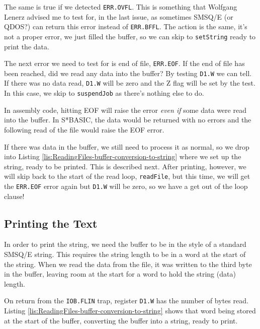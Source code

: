The same is true if we detected \texttt{ERR.OVFL}. This is something
that Wolfgang Lenerz advised me to test for, in the last issue, as
sometimes SMSQ/E (or QDOS?) can return this error instead of \texttt{ERR.BFFL}.
The action is the same, it's not a proper error, we just filled the
buffer, so we can skip to \texttt{setString} ready to print the data.

The next error we need to test for is end of file, \texttt{ERR.EOF}.
If the end of file has been reached, did we read any data into the
buffer? By testing \texttt{D1.W} we can tell. If there was no data
read, \texttt{D1.W} will be zero and the Z flag will be set by the
test. In this case, we skip to \texttt{suspendJob} as there's nothing
else to do.

In assembly code, hitting EOF will raise the error \emph{even if}
some data were read into the buffer. In S{*}BASIC, the data would
be returned with no errors and the following read of the file would
raise the EOF error.

If there was data in the buffer, we still need to process it as normal,
so we drop into Listing \ref{lis:ReadingFiles-buffer-conversion-to-string}
where we set up the string, ready to be printed. This is described
next. After printing, however, we will skip back to the start of the
read loop, \texttt{readFile}, but this time, we will get the \texttt{ERR.EOF}
error again but \texttt{D1.W} will be zero, so we have a get out of
the loop clause!

\subsection{Printing the Text}

In order to print the string, we need the buffer to be in the style
of a standard SMSQ/E string. This requires the string length to be
in a word at the start of the string. When we read the data from the
file, it was written to the third byte in the buffer, leaving room
at the start for a word to hold the string (data) length. 

On return from the \texttt{IOB.FLIN} trap, register \texttt{D1.W}
has the number of bytes read. Listing \ref{lis:ReadingFiles-buffer-conversion-to-string}
shows that word being stored at the start of the buffer, converting
the buffer into a string, ready to print. 



